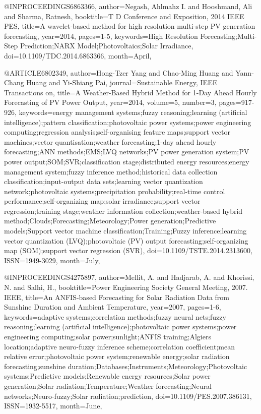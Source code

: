@INPROCEEDINGS{6863366, 
author={Negash, Ahlmahz I. and Hooshmand, Ali and Sharma, Ratnesh}, 
booktitle={T D Conference and Exposition, 2014 IEEE PES}, 
title={A wavelet-based method for high resolution multi-step PV generation forecasting}, 
year={2014}, 
pages={1-5}, 
keywords={High Resolution Forecasting;Multi-Step Prediction;NARX Model;Photovoltaics;Solar Irradiance}, 
doi={10.1109/TDC.2014.6863366}, 
month={April},}

@ARTICLE{6802349, 
author={Hong-Tzer Yang and Chao-Ming Huang and Yann-Chang Huang and Yi-Shiang Pai}, 
journal={Sustainable Energy, IEEE Transactions on}, 
title={A Weather-Based Hybrid Method for 1-Day Ahead Hourly Forecasting of PV Power Output}, 
year={2014}, 
volume={5}, 
number={3}, 
pages={917-926}, 
keywords={energy management systems;fuzzy reasoning;learning (artificial intelligence);pattern classification;photovoltaic power systems;power engineering computing;regression analysis;self-organising feature maps;support vector machines;vector quantisation;weather forecasting;1-day ahead hourly forecasting;ANN methods;EMS;LVQ networks;PV power generation system;PV power output;SOM;SVR;classification stage;distributed energy resources;energy management system;fuzzy inference method;historical data collection classification;input-output data sets;learning vector quantization network;photovoltaic systems;precipitation probability;real-time control performance;self-organizing map;solar irradiance;support vector regression;training stage;weather information collection;weather-based hybrid method;Clouds;Forecasting;Meteorology;Power generation;Predictive models;Support vector machine classification;Training;Fuzzy inference;learning vector quantization (LVQ);photovoltaic (PV) output forecasting;self-organizing map (SOM);support vector regression (SVR)}, 
doi={10.1109/TSTE.2014.2313600}, 
ISSN={1949-3029}, 
month={July},}

@INPROCEEDINGS{4275897, 
author={Mellit, A. and Hadjarab, A. and Khorissi, N. and Salhi, H.}, 
booktitle={Power Engineering Society General Meeting, 2007. IEEE}, 
title={An ANFIS-based Forecasting for Solar Radiation Data from Sunshine Duration and Ambient Temperature}, 
year={2007}, 
pages={1-6}, 
keywords={adaptive systems;correlation methods;fuzzy neural nets;fuzzy reasoning;learning (artificial intelligence);photovoltaic power systems;power engineering computing;solar power;sunlight;ANFIS training;Algiers location;adaptive neuro-fuzzy inference scheme;correlation coefficient;mean relative error;photovoltaic power system;renewable energy;solar radiation forecasting;sunshine duration;Databases;Instruments;Meteorology;Photovoltaic systems;Predictive models;Renewable energy resources;Solar power generation;Solar radiation;Temperature;Weather forecasting;Neural networks;Neuro-fuzzy;Solar radiation;prediction}, 
doi={10.1109/PES.2007.386131}, 
ISSN={1932-5517}, 
month={June},}

